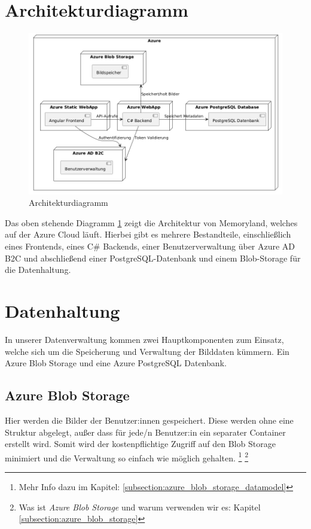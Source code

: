
\section{Architekturdiagramm}

\begin{figure} [h t]
    \centering
    \includegraphics[scale=0.4]{puml/architecture-diagram.png}
    \caption{Architekturdiagramm}
    \label{fig:architectur-diagram}
\end{figure}

Das oben stehende Diagramm \ref{fig:architectur-diagram} zeigt die Architektur von Memoryland,
welches auf der Azure Cloud läuft. Hierbei gibt es mehrere Bestandteile, 
einschlie\ss{}lich eines Frontends, eines C\# Backends, einer Benutzerverwaltung 
über Azure AD B2C und abschlie\ss{}end einer PostgreSQL-Datenbank und einem 
Blob-Storage für die Datenhaltung.

\section{Datenhaltung}

In unserer Datenverwaltung kommen zwei Hauptkomponenten zum Einsatz, welche sich um die 
Speicherung und Verwaltung der Bilddaten kümmern. Ein Azure Blob Storage und eine Azure 
PostgreSQL Datenbank.

\subsection{Azure Blob Storage}

Hier werden die Bilder der Benutzer:innen gespeichert. Diese werden 
ohne eine Struktur abgelegt, au\ss{}er dass für jede/n Benutzer:in ein separater Container erstellt 
wird. Somit wird der kostenpflichtige Zugriff auf den Blob Storage minimiert und die Verwaltung
so einfach wie möglich gehalten.
\footnote{Mehr Info dazu im Kapitel: \ref{subsection:azure_blob_storage_datamodel}}
\footnote{Was ist \emph{Azure Blob Storage} und warum verwenden wir es: Kapitel \ref{subsection:azure_blob_storage}}


